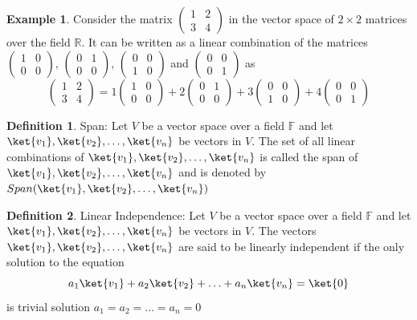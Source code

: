 \documentclass[12pt, oneside]{book}
\theoremstyle{definition}
\newtheorem{definition}{Definition}[section]
\theoremstyle{definition}
\newtheorem{example}{Example}[section]
\theoremstyle{remark}
\begin{document}
\begin{example}
    Consider the matrix $\begin{pmatrix} 1 & 2 \\ 3 & 4 \end{pmatrix}$ in the vector space of $2\times 2$ matrices over the field $\mathbb{R}$. It can be written as a linear combination of the matrices
    $\begin{pmatrix} 1 & 0 \\ 0 & 0 \end{pmatrix}$, $\begin{pmatrix} 0 & 1 \\ 0 & 0 \end{pmatrix}$, $\begin{pmatrix} 0 & 0 \\ 1 & 0 \end{pmatrix}$ and $\begin{pmatrix} 0 & 0 \\ 0 & 1 \end{pmatrix}$ as
    \[
        \begin{pmatrix} 1 & 2 \\ 3 & 4 \end{pmatrix}=1\begin{pmatrix} 1 & 0 \\ 0 & 0 \end{pmatrix}+2\begin{pmatrix} 0 & 1 \\ 0 & 0 \end{pmatrix}+3\begin{pmatrix} 0 & 0 \\ 1 & 0 \end{pmatrix}+4\begin{pmatrix} 0 & 0 \\ 0 & 1 \end{pmatrix}
    \]
\end{example}

\begin{definition}
    Span: Let $V$ be a vector space over a field $\mathbb{F}$ and 
    let $\ket{v_1},\ket{v_2},\ldots,\ket{v_n}$ be vectors in $V$. 
    The set of all linear combinations of $\ket{v_1},\ket{v_2},\ldots,\ket{v_n}$ 
    is called the span of $\ket{v_1},\ket{v_2},\ldots,\ket{v_n}$ 
    and is denoted by $Span(\ket{v_1},\ket{v_2},\ldots,\ket{v_n})$
\end{definition}

\begin{definition}
    Linear Independence: Let $V$ be a vector space over a field $\mathbb{F}$ and let $\ket{v_1},\ket{v_2},\ldots,\ket{v_n}$ be vectors in $V$. The vectors $\ket{v_1},\ket{v_2},\ldots,\ket{v_n}$ are said to be linearly independent if the only solution to the equation
    \begin{equation}
        a_1\ket{v_1}+a_2\ket{v_2}+\ldots+a_n\ket{v_n}=\ket{0}
        \label{eq:Linear Independence}
    \end{equation}
    is trivial solution $a_1=a_2=\ldots=a_n=0$
\end{definition}
\end{document}

